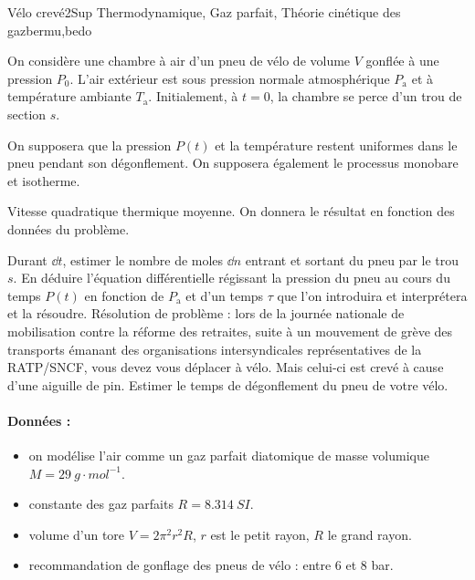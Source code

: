 

\begin{exercise}{Vélo crevé}{2}{Sup}
{Thermodynamique, Gaz parfait, Théorie cinétique des gaz}{bermu,bedo}

On considère une chambre à air d'un pneu de vélo de volume $V$ gonflée à une pression $P_0$. L'air extérieur est sous pression normale atmosphérique $P_\text{a}$ et à température ambiante $T_\text{a}$. Initialement, à $t=0$, la chambre se perce d'un trou de section $s$.

On supposera que la pression $P(t)$ et la température restent uniformes dans le pneu pendant son dégonflement. On supposera également le processus monobare et isotherme.

\begin{questions}
    \questioncours Vitesse quadratique thermique moyenne. On donnera le résultat en fonction des données du problème.
    
    \question Durant $\dd{t}$, estimer le nombre de moles $\dd{n}$ entrant et sortant du pneu par le trou $s$.
    \question En déduire l'équation différentielle régissant la pression du pneu au cours du temps $P(t)$ en fonction de $P_\text{a}$ et d'un temps $\tau$ que l'on introduira et interprétera et la résoudre.
    \question \textsf{Résolution de problème :} lors de la journée nationale de mobilisation contre la réforme des retraites, suite à un mouvement de grève des transports émanant des organisations intersyndicales représentatives de la RATP/SNCF, vous devez vous déplacer à vélo. Mais celui-ci est crevé à cause d'une aiguille de pin. Estimer le temps de dégonflement du pneu de votre vélo.

\end{questions}

\paragraph{Données :}
\begin{itemize}
    \item on modélise l'air comme un gaz parfait diatomique de masse volumique $M = \SI{29}{g\cdot mol^{-1}}$.
    \item constante des gaz parfaits $R = \SI{8,314}{SI}$.
    \item volume d'un tore $V = 2\pi^2 r^2 R$, $r$ est le petit rayon, $R$ le grand rayon.
    \item recommandation de gonflage des pneus de vélo : entre 6 et 8 bar.
\end{itemize}
\end{exercise}

